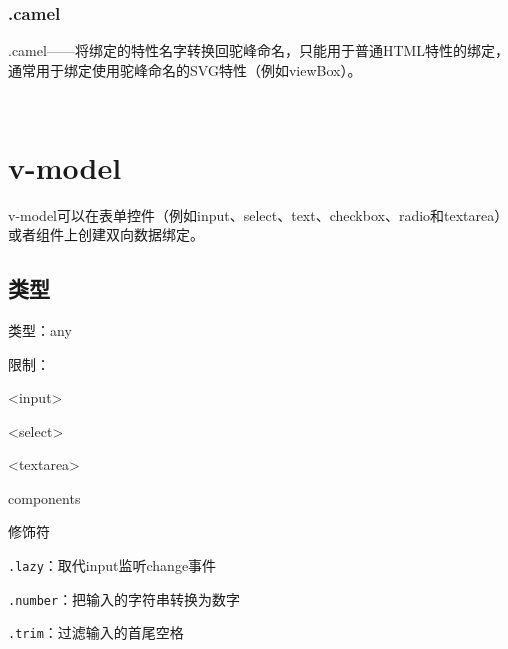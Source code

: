 \subsection{.camel}

.camel——将绑定的特性名字转换回驼峰命名，只能用于普通HTML特性的绑定，通常用于绑定使用驼峰命名的SVG特性（例如viewBox）。

\begin{lstlisting}[language=JavaScript]

\end{lstlisting}




\begin{lstlisting}[language=JavaScript]

\end{lstlisting}


\chapter{v-model}



v-model可以在表单控件（例如input、select、text、checkbox、radio和textarea）或者组件上创建双向数据绑定。


\section{类型}

\begin{compactitem}
\item 类型：any
\item 限制：

\begin{compactenum}
\item <input>
\item <select>
\item <textarea>
\item components
\end{compactenum}

\item 修饰符

\begin{compactenum}
\item \texttt{.lazy}：取代input监听change事件
\item \texttt{.number}：把输入的字符串转换为数字
\item \texttt{.trim}：过滤输入的首尾空格
\end{compactenum}

\end{compactitem}


